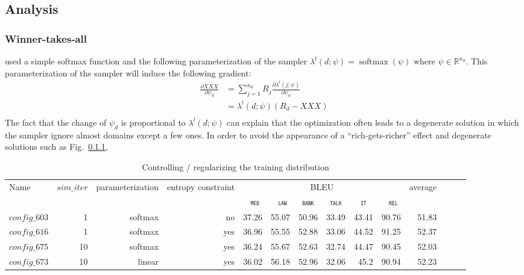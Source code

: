 \documentclass[11pt,a4paper]{article}
\newcommand{\fyTodo}[1]{\Todo[FY:]{\textcolor{orange}{#1}}}
\newcommand{\domain}[1]{\texttt{\textsc{#1}}}
\newcommand{\system}[1]{\texttt{{#1}}}
\begin{document}
\subsection{Analysis}

\subsubsection{Winner-takes-all}
\cite{Wang20balancing} used a simple softmax function and the following parameterization of the sampler $\lambda^l(d;\psi) = \operatorname{softmax}(\psi)$ where $\psi \in \mathbb{R}^{n_d}$. This parameterization of the sampler will induce the following gradient:\fyTodo{Change name of obj. function}
\begin{align*}
\frac{\partial XXX}{\partial \psi_d} & = \displaystyle{\mathop{\sum}_{j=1}^{n_d}} R_j \frac{\partial \lambda^l(j; \psi)}{\partial \psi_d} \\
	& = \lambda^l(d; \psi) (R_d- XXX)\\
\end{align*} 
The fact that the change of $\psi_d$ is proportional to $\lambda^l(d; \psi)$ can explain that the optimization often leads to a degenerate solution in which the sampler ignore almost domains except a few ones. In order to avoid the appearance of a ``rich-gets-richer'' effect and degenerate solutions such as Fig.~\ref{},

\begin{table}
  \centering %
  \begin{adjustbox}{width=1.0\textwidth,center}
  \begin{tabular}{|p{2.0cm}|*{13}{r|}} \hline
    \multirow{2}{*}{Name} & \multirow{2}{*}{$sim\_iter$} & \multirow{2}{*}{parameterization} & \multirow{2}{*}{entropy constraint} & \multicolumn{6}{|c|}{BLEU} & \multirow{2}{*}{average} \\ \cline{5-10}	
   & & & & \multicolumn{1}{c|}{\domain{ med}} & \multicolumn{1}{c|}{\domain{ law}} & \multicolumn{1}{c|}{\domain{bank}} & \multicolumn{1}{c|}{\domain{talk}} & \multicolumn{1}{c|}{\domain{ it }} & \multicolumn{1}{c|}{\domain{ rel}} &  \\
    \hline
    \system{$config\_603$} & 1 & softmax & no & 37.26& 55.07& 50.96& 33.49& 43.41& 90.76& 51.83\\
    \system{$config\_616$} & 1 & softmax & yes & 36.96& 55.55& 52.88& 33.06& 44.52& 91.25& 52.37 \\
    \system{$config\_675$} & 10 & softmax & yes & 36.24& 55.67& 52.63& 32.74& 44.47& 90.45& 52.03\\
    \system{$config\_673$} & 10 & linear & yes & 36.02& 56.18& 52.96& 32.06& 45.2 & 90.94 & 52.23 \\
  \hline
  \end{tabular}
  \end{adjustbox}
  \caption{Controlling / regularizing the training distribution}
  \label{tab:performance}
\end{table}
\end{document}
